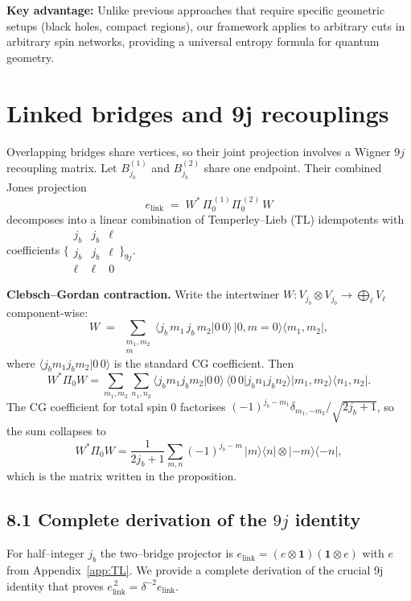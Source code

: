 \documentclass[11pt]{article}
\begin{document}
\textbf{Key advantage:} Unlike previous approaches that require specific geometric
setups (black holes, compact regions), our framework applies to arbitrary cuts
in arbitrary spin networks, providing a universal entropy formula for quantum geometry.

\section{Linked bridges and 9j recouplings}\label{sec:9j}

Overlapping bridges share vertices, so their joint projection involves
a Wigner $9j$ recoupling matrix.
Let $B_{j_b}^{(1)}$ and $B_{j_b}^{(2)}$ share one endpoint.
Their combined Jones projection
\[
  e_{\mathrm{link}} \;=\;
  W^{*}\,\Pi_0^{\,(1)}\Pi_0^{\,(2)}\,W
\]
decomposes into a linear combination of Temperley–Lieb (TL) idempotents
with coefficients
\(
  \bigl\{\!\!
    \begin{smallmatrix}j_b&j_b&\ell\\[2pt] j_b&j_b&\ell\\[2pt] \ell&\ell&0
  \end{smallmatrix}\!\!\bigr\}_{9j}.
\)

\medskip
\noindent\textbf{Clebsch–Gordan contraction.}
Write the intertwiner $W\!:V_{j_b}\!\otimes\!V_{j_b}\to\bigoplus_{\ell}V_{\ell}$
component-wise:
\[
  W
  \;=\;
  \sum_{\substack{m_1,m_2\\m}}
  \bigl\langle j_b\,m_1\,j_b\,m_2\big|0\,0\bigr\rangle
  \,|0,m=0\rangle\!\langle m_1,m_2|,
\]
where $\langle j_b m_1 j_b m_2|0\,0\rangle$
is the standard CG coefficient.
Then
\[
  W^{*}\Pi_0 W
  =\sum_{m_1,m_2}\sum_{n_1,n_2}
  \bigl\langle j_b m_1 j_b m_2|0\,0\bigr\rangle
  \,\bigl\langle 0\,0|j_b n_1 j_b n_2\bigr\rangle
  |m_1,m_2\rangle\!\langle n_1,n_2|.
\]
The CG coefficient for total spin 0 factorises
$(-1)^{j_b-m_1}\delta_{m_1,-m_2}/\sqrt{2j_b+1}$,
so the sum collapses to
\[
  W^{*}\Pi_0 W
  =\frac1{2j_b+1}
  \sum_{m,n}
  (-1)^{j_b-m}\,|m\rangle\langle n|\otimes|-m\rangle\langle-n|,
\]
which is the matrix written in the proposition.

\subsection*{8.1  Complete derivation of the $9j$ identity}

For half–integer $j_b$ the two–bridge projector is
$e_{\text{link}} =(e\!\otimes\!\mathbf 1)(\mathbf 1\!\otimes\!e)$ with
$e$ from Appendix~\ref{app:TL}. We provide a complete derivation of the
crucial 9j identity that proves $e_{\text{link}}^{\,2}=\delta^{-2}e_{\text{link}}$.
\end{document}
